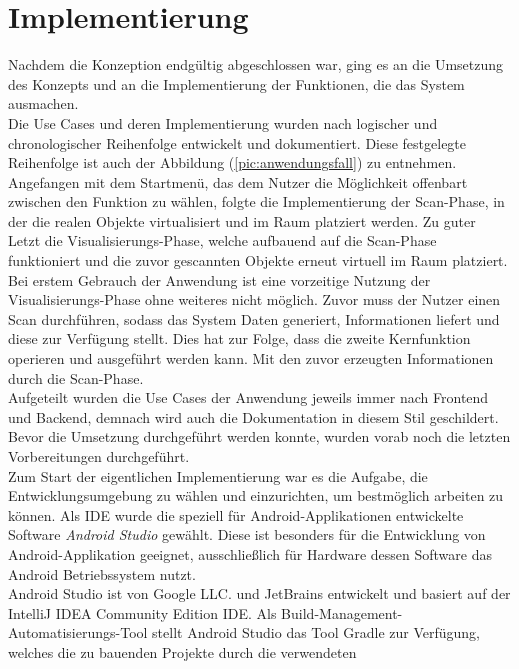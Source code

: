 \section{Implementierung}
\label{chap:implementierung}
Nachdem die Konzeption endgültig abgeschlossen war, ging es an die Umsetzung des Konzepts und an die Implementierung der Funktionen, die das System 
ausmachen. 
\\ 
Die Use Cases und deren Implementierung wurden nach logischer und chronologischer Reihenfolge entwickelt und dokumentiert. Diese festgelegte Reihenfolge 
ist auch der Abbildung (\ref{pic:anwendungsfall}) zu entnehmen. Angefangen mit dem Startmenü, das dem Nutzer die Möglichkeit offenbart zwischen den Funktion 
zu wählen, folgte die Implementierung der Scan-Phase, in der die realen Objekte virtualisiert und im Raum platziert werden. Zu guter Letzt die Visualisierungs-Phase, 
welche aufbauend auf die Scan-Phase funktioniert und die zuvor gescannten Objekte erneut virtuell im Raum platziert. 
\\ 
Bei erstem Gebrauch der Anwendung ist eine vorzeitige Nutzung der Visualisierungs-Phase ohne weiteres nicht möglich. Zuvor muss der Nutzer einen Scan durchführen, sodass 
das System Daten generiert, Informationen liefert und diese zur Verfügung stellt. Dies hat zur Folge, dass die zweite Kernfunktion operieren und ausgeführt werden kann. 
Mit den zuvor erzeugten Informationen durch die Scan-Phase.
\\ 
\linebreak 
Aufgeteilt wurden die Use Cases der Anwendung jeweils immer nach Frontend und Backend, demnach wird auch die Dokumentation in diesem Stil geschildert. 
\\ 
\linebreak
Bevor die Umsetzung durchgeführt werden konnte, wurden vorab noch die letzten Vorbereitungen durchgeführt.
\\ 
Zum Start der eigentlichen Implementierung war es die Aufgabe, die Entwicklungsumgebung zu wählen und einzurichten, um bestmöglich arbeiten zu können. Als 
\ac{IDE} wurde die speziell für Android-Applikationen entwickelte Software \textit{Android Studio} gewählt. Diese ist besonders für die Entwicklung von 
Android-Applikation geeignet, ausschließlich für Hardware dessen Software das Android Betriebssystem nutzt. 
\\
Android Studio ist von Google LLC. und JetBrains entwickelt und basiert auf der IntelliJ IDEA Community Edition \acs{IDE}. Als 
Build-Management-Automatisierungs-Tool stellt Android Studio das Tool Gradle zur Verfügung, welches die zu bauenden Projekte durch die verwendeten 
